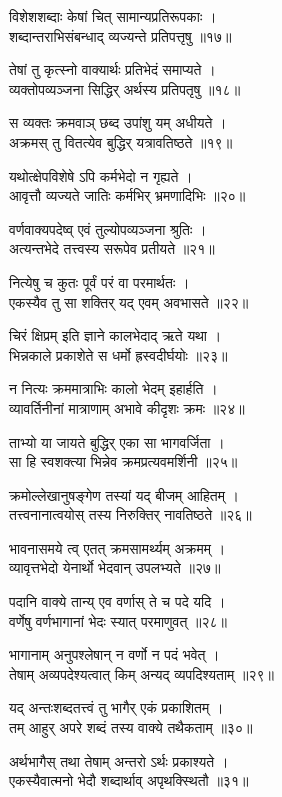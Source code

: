विशेशशब्दाः केषां चित् सामान्यप्रतिरूपकाः ।\\शब्दान्तराभिसंबन्धाद् व्यज्यन्ते प्रतिपत्तृषु ॥१७॥

तेषां तु कृत्स्नो वाक्यार्थः प्रतिभेदं समाप्यते ।\\व्यक्तोपव्यञ्जना सिद्धिर् अर्थस्य प्रतिपतृषु ॥१८॥

स व्यक्तः क्रमवाञ् छब्द उपांशु यम् अधीयते ।\\अक्रमस् तु वितत्येव बुद्धिर् यत्रावतिष्ठते ॥१९॥

यथोत्क्षेपविशेषे ऽपि कर्मभेदो न गृह्यते ।\\आवृत्तौ व्यज्यते जातिः कर्मभिर् भ्रमणादिभिः ॥२०॥

वर्णवाक्यपदेष्व् एवं तुल्योपव्यञ्जना श्रुतिः ।\\अत्यन्तभेदे तत्त्वस्य सरूपेव प्रतीयते ॥२१॥

नित्येषु च कुतः पूर्वं परं वा परमार्थतः ।\\एकस्यैव तु सा शक्तिर् यद् एवम् अवभासते ॥२२॥

चिरं क्षिप्रम् इति ज्ञाने कालभेदाद् ऋते यथा ।\\भिन्नकाले प्रकाशेते स धर्मो ह्रस्वदीर्घयोः ॥२३॥

न नित्यः क्रममात्राभिः कालो भेदम् इहार्हति ।\\व्यावर्तिनीनां मात्राणाम् अभावे कीदृशः क्रमः ॥२४॥

ताभ्यो या जायते बुद्धिर् एका सा भागवर्जिता ।\\सा हि स्वशक्त्या भिन्नेव क्रमप्रत्यवमर्शिनी ॥२५॥

क्रमोल्लेखानुषङ्गेण तस्यां यद् बीजम् आहितम् ।\\तत्त्वनानात्वयोस् तस्य निरुक्तिर् नावतिष्ठते ॥२६॥

भावनासमये त्व् एतत् क्रमसामर्थ्यम् अक्रमम् ।\\व्यावृत्तभेदो येनार्थो भेदवान् उपलभ्यते ॥२७॥

पदानि वाक्ये तान्य् एव वर्णास् ते च पदे यदि ।\\वर्णेषु वर्णभागानां भेदः स्यात् परमाणुवत् ॥२८॥

भागानाम् अनुपश्लेषान् न वर्णो न पदं भवेत् ।\\तेषाम् अव्यपदेश्यत्वात् किम् अन्यद् व्यपदिश्यताम् ॥२९॥

यद् अन्तःशब्दतत्त्वं तु भागैर् एकं प्रकाशितम् ।\\तम् आहुर् अपरे शब्दं तस्य वाक्ये तथैकताम् ॥३०॥

अर्थभागैस् तथा तेषाम् अन्तरो ऽर्थः प्रकाश्यते ।\\एकस्यैवात्मनो भेदौ शब्दार्थाव् अपृथक्स्थितौ ॥३१॥


